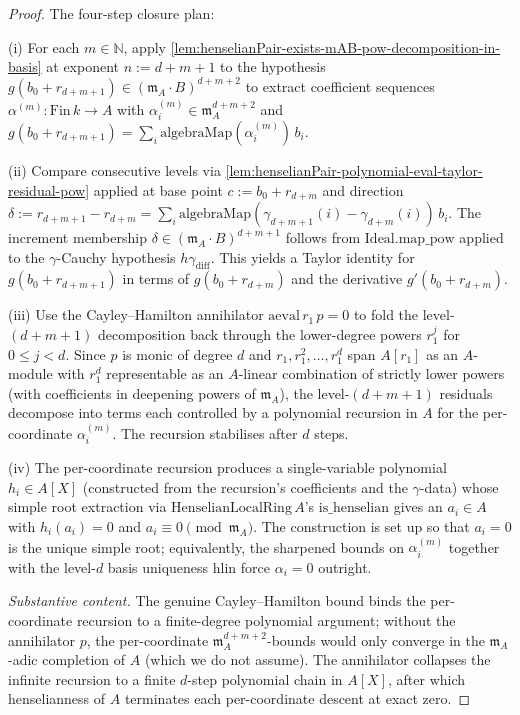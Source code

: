 \begin{proof}

\leanok
The four-step closure plan:

(i) For each $m \in \mathbb N$, apply
\cref{lem:henselianPair-exists-mAB-pow-decomposition-in-basis} at
exponent $n := d + m + 1$ to the hypothesis
$g(b_0 + r_{d+m+1}) \in (\mathfrak m_A \cdot B)^{d+m+2}$ to extract
coefficient sequences $\alpha^{(m)} : \mathrm{Fin}\,k \to A$ with
$\alpha^{(m)}_i \in \mathfrak m_A^{d + m + 2}$ and
$g(b_0 + r_{d+m+1}) = \sum_i
\mathrm{algebraMap}(\alpha^{(m)}_i)\,b_i$.

(ii) Compare consecutive levels via
\cref{lem:henselianPair-polynomial-eval-taylor-residual-pow}
applied at base point $c := b_0 + r_{d+m}$ and direction
$\delta := r_{d+m+1} - r_{d+m} = \sum_i \mathrm{algebraMap}
(\gamma_{d+m+1}(i) - \gamma_{d+m}(i))\,b_i$. The increment
membership $\delta \in (\mathfrak m_A \cdot B)^{d+m+1}$ follows
from $\mathrm{Ideal.map\_pow}$ applied to the $\gamma$-Cauchy
hypothesis $h\gamma_{\mathrm{diff}}$. This yields a Taylor
identity for $g(b_0 + r_{d+m+1})$ in terms of $g(b_0 + r_{d+m})$
and the derivative $g'(b_0 + r_{d+m})$.

(iii) Use the Cayley--Hamilton annihilator
$\mathrm{aeval}\,r_1\,p = 0$ to fold the level-$(d+m+1)$
decomposition back through the lower-degree powers $r_1^j$ for
$0 \le j < d$. Since $p$ is monic of degree $d$ and
$r_1, r_1^2, \ldots, r_1^d$ span $A[r_1]$ as an $A$-module with
$r_1^d$ representable as an $A$-linear combination of strictly
lower powers (with coefficients in deepening powers of $\mathfrak
m_A$), the level-$(d + m + 1)$ residuals decompose into terms each
controlled by a polynomial recursion in $A$ for the per-coordinate
$\alpha^{(m)}_i$. The recursion stabilises after $d$ steps.

(iv) The per-coordinate recursion produces a single-variable
polynomial $h_i \in A[X]$ (constructed from the recursion's
coefficients and the $\gamma$-data) whose simple root extraction
via $\mathrm{HenselianLocalRing}\,A$'s
$\mathrm{is\_henselian}$ gives an $a_i \in A$ with $h_i(a_i) = 0$
and $a_i \equiv 0 \pmod{\mathfrak m_A}$. The construction is set
up so that $a_i = 0$ is the unique simple root; equivalently, the
sharpened bounds on $\alpha^{(m)}_i$ together with the level-$d$
basis uniqueness $\mathrm{hlin}$ force $\alpha_i = 0$ outright.

\textit{Substantive content.} The genuine Cayley--Hamilton bound
binds the per-coordinate recursion to a finite-degree polynomial
argument; without the annihilator $p$, the per-coordinate
$\mathfrak m_A^{d + m + 2}$-bounds would only converge in the
$\mathfrak m_A$-adic completion of $A$ (which we do not assume).
The annihilator collapses the infinite recursion to a finite
$d$-step polynomial chain in $A[X]$, after which henselianness of
$A$ terminates each per-coordinate descent at exact zero.


\end{proof}
